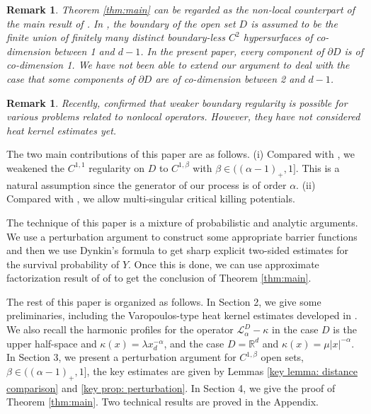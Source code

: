 \documentclass[12pt,a4paper]{amsart}
\numberwithin{equation}{section}
\theoremstyle{plain}
\newcommand{\R}{\mathbb{R}}
\newcommand{\1}{\mathbbm{1}}
\newtheorem{remark}[theorem]{Remark}
\begin{document}
\begin{remark}
{\rm Theorem \ref{thm:main} can be regarded as the non-local counterpart of the main result of \cite{Filipas09}. In
\cite{Filipas09}, the boundary of the open set $D$ is assumed to be the finite union of finitely many distinct boundary-less 
$C^2$ hypersurfaces of co-dimension between 1 and $d-1$. In the present paper, every component of $\partial D$ is of co-dimension 1. We have not been able to extend our argument to deal with the case that some components of $\partial D$
are of co-dimension between 2 and $d-1$.  
}
\end{remark}

\begin{remark}{\rm 
Recently, \cite{Antonio24, Florian24, KM24} confirmed that weaker boundary regularity is possible for various problems related to nonlocal operators. However, they have not considered heat kernel estimates yet.
}
\end{remark} 
The two main contributions of this paper are as follows. (i) Compared with \cite[Theorem 3.2]{CKSV20}, we weakened  the $C^{1, 1}$ regularity on $D$ to $C^{1, \beta}$ with $\beta \in ((\alpha-1)_+,1]$. This is a natural assumption since the generator of our process is of order $\alpha$. (ii) Compared with \cite{CKSV20, JW20}, we allow multi-singular critical killing potentials. 

The technique of this paper is a mixture of probabilistic and analytic arguments. We use a perturbation argument to construct some appropriate barrier functions and then we use Dynkin's formula to get sharp explicit two-sided estimates for the survival probability of $Y$.  Once this is done, we can use approximate factorization result of 
of \cite[Theorem 2.23]{CKSV20} to get the conclusion of Theorem \ref{thm:main}.

The rest of this paper is organized as follows. In Section 2, we give some preliminaries, including the Varopoulos-type heat kernel estimates developed in \cite{CKSV20}. We also recall the harmonic profiles for the 
operator $\mathcal{L}_{\alpha}^D-\kappa$ in the case $D$ is the upper half-space and $\kappa(x)=\lambda x_d^{-\alpha}$,  and the case $D=\R^d$ and $\kappa(x)=\mu|x|^{-\alpha}$. In Section 3, we present a perturbation argument for $C^{1,\beta}$  open sets, $\beta \in ((\alpha-1)_+,1]$, the key estimates are given by Lemmas \ref{key lemma: distance comparison} and \ref{key prop: perturbation}. In Section 4, we give the proof of Theorem \ref{thm:main}. Two technical results are proved in the Appendix.
\end{document}
